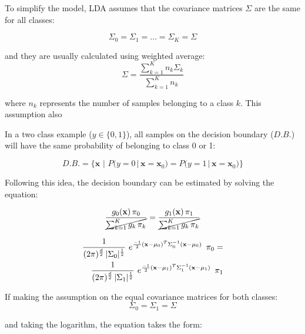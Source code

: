 \documentclass{article}
\begin{document}
To simplify the model, LDA assumes that the covariance matrices $\Sigma$ are the same for all classes:

\begin{equation} 
\Sigma_0 = \Sigma_1 = \dots = \Sigma_K = \Sigma
\end{equation}

and they are usually calculated using weighted average:
\begin{equation} 
\Sigma = \frac{\sum_{k=1}^K {n_k\Sigma_k}}{\sum_{k=1}^K{n_k}}
\end{equation}

where $n_k$ represents the number of samples belonging to a class $k$. This assumption also 

In a two class example ($y \in \{0,1\}$), all samples on the decision boundary ($D.B.$) will have the same probability of belonging to class 0 or 1:

\begin{equation} 
D.B. = \Big\{\mathbf{x}\,\, \Big| \,\,P\big(y=0 \, \big| \, \mathbf{x}=\mathbf{x}_0\big) = P\big(y=1 \, \big| \, \mathbf{x}=\mathbf{x}_0\big) \Big\}
\end{equation}

Following this idea, the decision boundary can be estimated by solving the equation:

\begin{equation} 
\frac{g_0(\mathbf{x}) \, \pi_0} {\cancel{\sum_{k=1}^K{g_k \, \pi_k}}} = \frac{g_1(\mathbf{x}) \, \pi_1} {\cancel{\sum_{k=1}^K{g_k \, \pi_k}}}
\end{equation}


\begin{equation} 
\begin{split}
\frac{1}{(2 \pi)^{\nicefrac{d}{2}}\, |\Sigma_0|^{\nicefrac{1}{2}}}\,\, e^{\nicefrac{-1}{2}  (\mathbf{x}-\mu_0)^T  \Sigma_0^{-1} (\mathbf{x}-\mu_0)}  \,\,\,\pi_0 = \\
\frac{1}{(2 \pi)^{\nicefrac{d}{2}}\, |\Sigma_1|^{\nicefrac{1}{2}}}\,\, e^{\nicefrac{-1}{2}  (\mathbf{x}-\mu_1)^T  \Sigma_1^{-1} (\mathbf{x}-\mu_1)}  \,\,\,\pi_1
\end{split}
\end{equation}

If making the assumption on the equal covariance matrices for both classes:
\begin{equation} 
\Sigma_0 = \Sigma_1  = \Sigma
\end{equation}

and taking the logarithm, the equation takes the form: 
\end{document}
